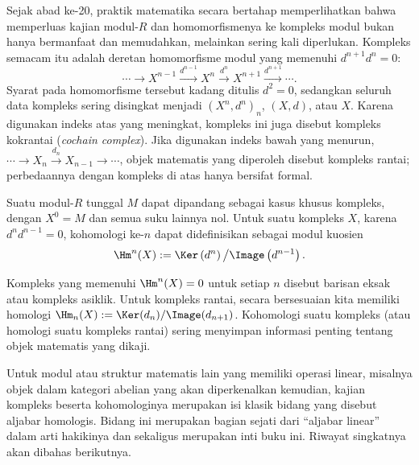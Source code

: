 Sejak abad ke-20, praktik matematika secara bertahap memperlihatkan bahwa
memperluas kajian modul-$R$ dan homomorfismenya ke kompleks modul bukan
hanya bermanfaat dan memudahkan, melainkan sering kali diperlukan.
Kompleks semacam itu adalah deretan homomorfisme modul yang memenuhi
$d^{n+1}d^n=0$:
\[
  \cdots \longrightarrow X^{n-1} \xrightarrow{d^{n-1}} X^n
  \xrightarrow{d^n} X^{n+1} \xrightarrow{d^{n+1}} \cdots .
\]
Syarat pada homomorfisme tersebut kadang ditulis $d^2=0$, sedangkan
seluruh data kompleks sering disingkat menjadi $(X^n,d^n)_n$, $(X,d)$,
atau $X$. Karena digunakan indeks atas yang meningkat, kompleks ini juga
disebut kompleks kokrantai (\emph{cochain complex}). Jika digunakan indeks
bawah yang menurun,
$\cdots\to X_n\xrightarrow{d_n}X_{n-1}\to\cdots$, objek matematis yang
diperoleh disebut kompleks rantai; perbedaannya dengan kompleks di atas
hanya bersifat formal.

Suatu modul-$R$ tunggal $M$ dapat dipandang sebagai kasus khusus kompleks,
dengan $X^0=M$ dan semua suku lainnya nol. Untuk suatu kompleks $X$,
karena $d^nd^{n-1}=0$, kohomologi ke-$n$ dapat didefinisikan sebagai
modul kuosien
\[
  \Hm^n(X):=\Ker\left(d^n\right)\big/\Image\left(d^{n-1}\right).
\]

Kompleks yang memenuhi $\Hm^n(X)=0$ untuk setiap $n$ disebut barisan
eksak atau kompleks asiklik. Untuk kompleks rantai, secara bersesuaian
kita memiliki homologi
$\Hm_n(X):=\Ker(d_n)/\Image(d_{n+1})$. Kohomologi suatu kompleks (atau
homologi suatu kompleks rantai) sering menyimpan informasi penting
tentang objek matematis yang dikaji.

\enlargethispage{3\baselineskip}
Untuk modul atau struktur matematis lain yang memiliki operasi linear,
misalnya objek dalam kategori abelian yang akan diperkenalkan kemudian,
kajian kompleks beserta kohomologinya merupakan isi klasik bidang yang
disebut aljabar homologis. Bidang ini merupakan bagian sejati dari
``aljabar linear'' dalam arti hakikinya dan sekaligus merupakan inti buku
ini. Riwayat singkatnya akan dibahas berikutnya.
